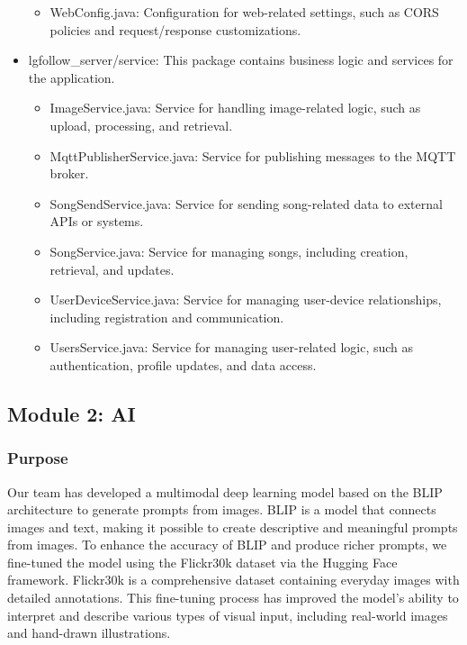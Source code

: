 \documentclass[conference]{IEEEtran}
\begin{document}
\begin{itemize}
\begin{itemize}
        \item WebConfig.java: Configuration for web-related settings, such as CORS policies and request/response customizations. \\
    \end{itemize}
    \item lgfollow\_server/service: This package contains business logic and services for the application.
    \begin{itemize}
        \item ImageService.java: Service for handling image-related logic, such as upload, processing, and retrieval. \\
        \item MqttPublisherService.java: Service for publishing messages to the MQTT broker. \\
        \item SongSendService.java: Service for sending song-related data to external APIs or systems. \\
        \item SongService.java: Service for managing songs, including creation, retrieval, and updates. \\
        \item UserDeviceService.java: Service for managing user-device relationships, including registration and communication. \\
        \item UsersService.java: Service for managing user-related logic, such as authentication, profile updates, and data access. \\
    \end{itemize}
\end{itemize}

\clearpage

\subsection{Module 2: AI}

\subsubsection{Purpose}
\noindent Our team has developed a multimodal deep learning model based on the BLIP architecture to generate prompts from images. BLIP is a model that connects images and text, making it possible to create descriptive and meaningful prompts from images. To enhance the accuracy of BLIP and produce richer prompts, we fine-tuned the model using the Flickr30k dataset via the Hugging Face framework. Flickr30k is a comprehensive dataset containing everyday images with detailed annotations. This fine-tuning process has improved the model's ability to interpret and describe various types of visual input, including real-world images and hand-drawn illustrations.\\
\end{document}
